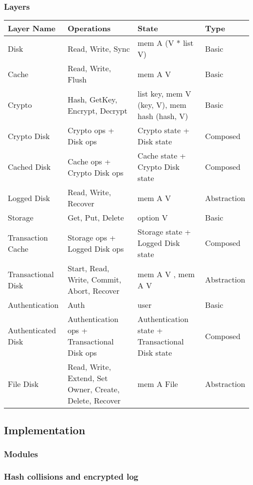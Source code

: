\documentclass[onecolumn]{paper}
\begin{document}
		\subsubsection{Layers}
			\begin{tabularx}{\linewidth}{|L|L|L|L|}
				\hline
				Layer Name &
				Operations &
				State &
				Type \\
				\hline
				Disk &
				Read, Write, Sync &
				mem A (V * list V) &
				Basic \\
				\hline
				Cache &
				Read, Write, Flush &
				mem A V &
				Basic \\
				\hline
				Crypto &
				Hash, GetKey, Encrypt, Decrypt &
				list key, mem V (key, V), mem hash (hash, V) &
				Basic \\
				\hline
				Crypto Disk &
				Crypto ops + Disk ops &
				Crypto state + Disk state &
				Composed \\
				\hline
				Cached Disk &
				Cache ops + Crypto Disk ops &
				Cache state + Crypto Disk state &
				Composed \\
				\hline
				Logged Disk &
				Read, Write, Recover &
				mem A V &
				Abstraction \\ 
				\hline
				Storage &
				Get, Put, Delete &
				option V &
				Basic \\
				\hline
				Transaction Cache &
				Storage ops + Logged Disk ops &
				Storage state + Logged Disk state &
				Composed \\
				\hline
				Transactional Disk &
				Start, Read, Write, Commit, Abort, Recover &
				mem A V , mem A V &
				Abstraction \\
				\hline
				Authentication &
				Auth &
				user &
				Basic \\
				\hline
				Authenticated Disk &
				Authentication ops + Transactional Disk ops &
				Authentication state + Transactional Disk state &
				Composed \\
				\hline
				File Disk &
				Read, Write, Extend, Set Owner, Create, Delete, Recover &
				mem A File &
				Abstraction \\
				\hline
			\end{tabularx}
	\subsection{Implementation}
		\subsubsection{Modules}
		\subsubsection{Hash collisions and encrypted log}
\newpage
\end{document}
